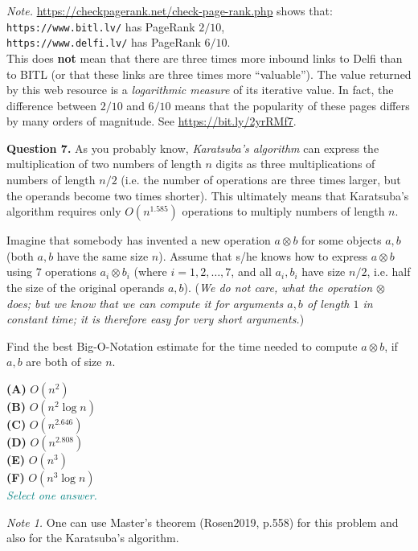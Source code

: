 \documentclass[jou]{apa6}
\begin{document}
\vspace{4pt}
{\em Note.} \url{https://checkpagerank.net/check-page-rank.php}
shows that:\\
{\tt https://www.bitl.lv/} has PageRank $2/10$,\\
{\tt https://www.delfi.lv/} has PageRank $6/10$.\\
This does {\bf not} mean that there are three times more 
inbound links to Delfi than to BITL (or that these links are three times more ``valuable''). 
The value returned by this web resource is a {\em logarithmic measure}
of its iterative value. In fact, the difference between $2/10$ and $6/10$
means that the popularity of these pages differs by many orders of magnitude. 
See \url{https://bit.ly/2yrRMf7}.


\vspace{10pt}
{\bf Question 7.} As you probably know, {\em Karatsuba's algorithm} can express 
the multiplication of two numbers of length $n$ digits as 
three multiplications of numbers of length $n/2$ (i.e. the number of 
operations are three times larger, but the operands become two times shorter). 
This ultimately means that Karatsuba's algorithm requires
only $O(n^{1.585})$ operations to multiply numbers of length $n$.

Imagine that somebody has invented a new operation $a \otimes b$ for 
some objects $a,b$ (both $a,b$ have the same size $n$). 
Assume that s/he knows how to express 
$a \otimes b$ using $7$ operations $a_i \otimes b_i$ (where $i = 1,2,\ldots,7$, and
all $a_i,b_i$ have size $n/2$, i.e. half the size of the original operands $a,b$). 
({\em We do not care, what the operation $\otimes$ does; but we know that we 
can compute it for arguments $a,b$ of length $1$ in constant time; it is 
therefore easy for very short arguments.})

Find the best Big-O-Notation estimate for the time needed to compute $a \otimes b$, if $a,b$ are
both of size $n$. 

{\bf (A)} $O(n^2)$\\
{\bf (B)} $O(n^2 \log n)$\\
{\bf (C)} $O(n^{2.646})$\\
{\bf (D)} $O(n^{2.808})$\\
{\bf (E)} $O(n^3)$\\
{\bf (F)} $O(n^3 \log n)$\\
\textcolor{teal}{\em Select one answer.}

\vspace{4pt}
{\em Note 1.} One can use Master's theorem (Rosen2019, p.558) for 
this problem and also for the Karatsuba's algorithm.
\end{document}
